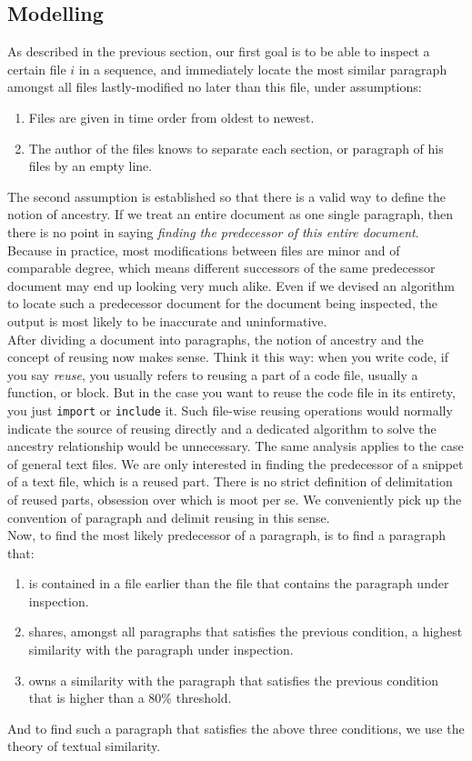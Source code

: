 \documentclass{article}
\begin{document}
\subsection{Modelling}
As described in the previous section, our first goal is to be able to inspect a certain file $i$ in a sequence, and immediately locate the most similar paragraph amongst all files lastly-modified no later than this file, under assumptions:
\begin{enumerate}
  \item Files are given in time order from oldest to newest.
  \item The author of the files knows to separate each section, or paragraph of his files by an empty line. 
\end{enumerate}

The second assumption is established so that there is a valid way to define the notion of ancestry. If we treat an entire document as one single paragraph, then there is no point in saying \textit{finding the predecessor of this entire document}. Because in practice, most modifications between files are minor and of comparable degree, which means different successors of the same predecessor document may end up looking very much alike. Even if we devised an algorithm to locate such a predecessor document for the document being inspected, the output is most likely to be inaccurate and uninformative. \\

After dividing a document into paragraphs, the notion of ancestry and the concept of reusing now makes sense. Think it this way: when you write code, if you say \textit{reuse}, you usually refers to reusing a part of a code file, usually a function, or block. But in the case you want to reuse the code file in its entirety, you just \texttt{import} or \texttt{include} it. Such file-wise reusing operations would normally indicate the source of reusing directly and a dedicated algorithm to solve the ancestry relationship would be unnecessary. The same analysis applies to the case of general text files. We are only interested in finding the predecessor of a snippet of a text file, which is a reused part. There is no strict definition of delimitation of reused parts, obsession over which is moot per se. We conveniently pick up the convention of paragraph and delimit reusing in this sense. \\

Now, to find the most likely predecessor of a paragraph, is to find a paragraph that:
\begin{enumerate}
  \item is contained in a file earlier than the file that contains the paragraph under inspection.
  \item shares, amongst all paragraphs that satisfies the previous condition, a highest similarity with the paragraph under inspection.
  \item owns a similarity with the paragraph that satisfies the previous condition that is higher than a 80\% threshold.
\end{enumerate}
And to find such a paragraph that satisfies the above three conditions, we use the theory of textual similarity. \\
\end{document}
